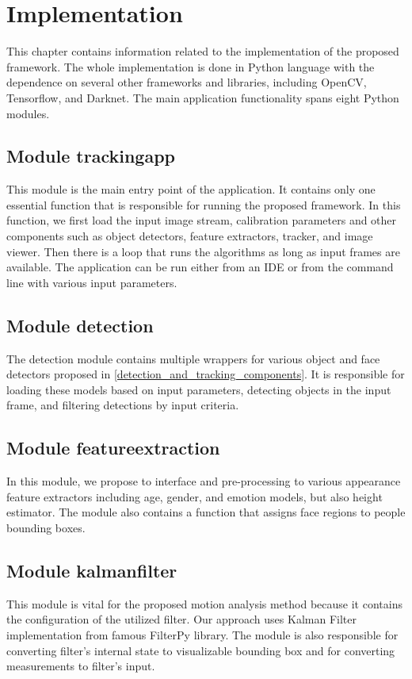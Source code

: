 \chapter{Implementation}
    This chapter contains information related to the implementation of the proposed framework. The whole implementation is done in Python language with the dependence on several other frameworks and libraries, including OpenCV, Tensorflow, and Darknet. The main application functionality spans eight Python modules.
    
\section{Module tracking\textunderscore app}
    This module is the main entry point of the application. It contains only one essential function that is responsible for running the proposed framework. In this function, we first load the input image stream, calibration parameters and other components such as object detectors, feature extractors, tracker, and image viewer. Then there is a loop that runs the algorithms as long as input frames are available. The application can be run either from an IDE or from the command line with various input parameters.

\section{Module detection}
    The detection module contains multiple wrappers for various object and face detectors proposed in \ref{detection_and_tracking_components}. It is responsible for loading these models based on input parameters, detecting objects in the input frame, and filtering detections by input criteria. 

\section{Module feature\textunderscore extraction}
    In this module, we propose to interface and pre-processing to various appearance feature extractors including age, gender, and emotion models, but also height estimator. The module also contains a function that assigns face regions to people bounding boxes.

\section{Module kalman\textunderscore filter}
    This module is vital for the proposed motion analysis method because it contains the configuration of the utilized filter. Our approach uses Kalman Filter implementation from famous FilterPy \cite{labbe2015kalman} library. The module is also responsible for converting filter's internal state to visualizable bounding box and for converting measurements to filter's input.

